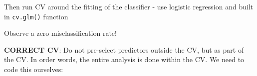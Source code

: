 \documentclass[
]{article}
\newenvironment{Shaded}{\begin{snugshade}}{\end{snugshade}}
\newcommand{\AttributeTok}[1]{\textcolor[rgb]{0.77,0.63,0.00}{#1}}
\newcommand{\ControlFlowTok}[1]{\textcolor[rgb]{0.13,0.29,0.53}{\textbf{#1}}}
\newcommand{\DecValTok}[1]{\textcolor[rgb]{0.00,0.00,0.81}{#1}}
\newcommand{\FloatTok}[1]{\textcolor[rgb]{0.00,0.00,0.81}{#1}}
\newcommand{\FunctionTok}[1]{\textcolor[rgb]{0.00,0.00,0.00}{#1}}
\newcommand{\NormalTok}[1]{#1}
\newcommand{\OtherTok}[1]{\textcolor[rgb]{0.56,0.35,0.01}{#1}}
\newcommand{\SpecialCharTok}[1]{\textcolor[rgb]{0.00,0.00,0.00}{#1}}
\newcommand{\StringTok}[1]{\textcolor[rgb]{0.31,0.60,0.02}{#1}}
\begin{document}
Then run CV around the fitting of the classifier - use logistic
regression and built in \texttt{cv.glm()} function

\begin{Shaded}
\end{Shaded}

Observe a zero misclassification rate!

\textbf{CORRECT CV}: Do not pre-select predictors outside the CV, but as
part of the CV. In order words, the entire analysis is done within the
CV. We need to code this ourselves:
\end{document}
